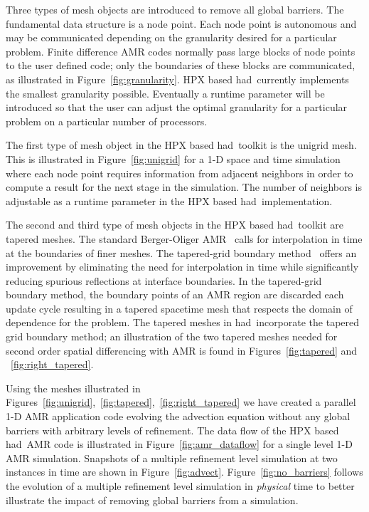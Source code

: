 \documentclass[prd,aps,showpacs,nofootinbib,floats,floatfix,twocolumn,letterpaper]{revtex4}
\newcommand{\had}{{\sc had}}
\begin{document}
Three types of mesh objects are introduced to remove all global barriers.  The fundamental
data structure is a node point.  Each node point is autonomous and may be communicated
depending on the granularity desired for a particular problem.  
Finite difference AMR codes normally pass large blocks of node points to the user defined
code; only the boundaries of these blocks are communicated, as illustrated in Figure~\ref{fig:granularity}.
HPX based \had\ currently implements the smallest granularity possible.  Eventually 
a runtime parameter will be introduced so that the user can adjust the optimal granularity for a
particular problem on a particular number of processors.  

The first type of mesh object in the HPX based \had\ toolkit is the unigrid mesh.  This is illustrated
 in Figure~\ref{fig:unigrid} for a 1-D space and time simulation where each node point requires information
from adjacent neighbors in order to compute a result for the next stage in the simulation.
The number of neighbors is adjustable as a runtime parameter in the HPX based \had\ implementation.

The second and third type of mesh objects in the HPX based \had\ toolkit are tapered meshes.
The standard Berger-Oliger AMR~\cite{Berger} calls for interpolation in time at the boundaries
of finer meshes.  The tapered-grid boundary method~\cite{Lehner:2005vc}   
offers an improvement by eliminating the need for interpolation in time while significantly
reducing spurious reflections at interface boundaries.  In the tapered-grid boundary method, the boundary points
of an AMR region are discarded each update cycle resulting in a tapered spacetime mesh that respects the domain of
dependence for the problem.  The tapered meshes in \had\
incorporate the tapered grid boundary method; an illustration of the two tapered meshes
needed for second order spatial differencing with AMR is found in Figures~\ref{fig:tapered} and ~\ref{fig:right_tapered}.

Using the meshes illustrated in Figures~\ref{fig:unigrid},~\ref{fig:tapered},~\ref{fig:right_tapered} we have created
a parallel 1-D AMR application code evolving the advection equation without any global barriers with arbitrary 
levels of refinement.  The data flow of the HPX based \had\ AMR code is illustrated in Figure~\ref{fig:amr_dataflow} 
for a single level 1-D AMR simulation.   Snapshots of a multiple refinement level simulation at two instances in time are shown in 
Figure~\ref{fig:advect}.  Figure~\ref{fig:no_barriers} follows the evolution of a multiple refinement level simulation 
in {\it physical} time to better illustrate the impact of removing global barriers from a simulation.
\end{document}
